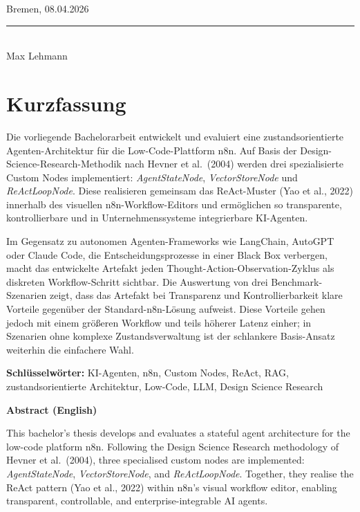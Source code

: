 \documentclass[12pt,a4paper,oneside]{report}
\begin{document}
\vspace{2cm}
\noindent
Bremen, 08.04.2026

\vspace{1.5cm}
\noindent\rule{7cm}{0.4pt}\\
Max Lehmann

\newpage

\thispagestyle{empty}
\chapter*{Kurzfassung}

Die vorliegende Bachelorarbeit entwickelt und evaluiert eine zustandsorientierte
Agenten-Architektur für die Low-Code-Plattform n8n. Auf Basis der Design-Science-Research-Methodik
nach Hevner et al.\ (2004) werden drei spezialisierte Custom Nodes implementiert:
\textit{AgentStateNode}, \textit{VectorStoreNode} und \textit{ReActLoopNode}. Diese
realisieren gemeinsam das ReAct-Muster (Yao et al., 2022) innerhalb des visuellen
n8n-Workflow-Editors und ermöglichen so transparente, kontrollierbare und in
Unternehmenssysteme integrierbare KI-Agenten.

Im Gegensatz zu autonomen Agenten-Frameworks wie LangChain, AutoGPT oder Claude Code,
die Entscheidungsprozesse in einer Black Box verbergen, macht das entwickelte Artefakt
jeden Thought-Action-Observation-Zyklus als diskreten Workflow-Schritt sichtbar.
Die Auswertung von drei Benchmark-Szenarien zeigt, dass das Artefakt bei Transparenz
und Kontrollierbarkeit klare Vorteile gegenüber der Standard-n8n-Lösung aufweist. Diese
Vorteile gehen jedoch mit einem größeren Workflow und teils höherer Latenz einher; in
Szenarien ohne komplexe Zustandsverwaltung ist der schlankere Basis-Ansatz weiterhin
die einfachere Wahl.

\vspace{1cm}
\noindent\textbf{Schlüsselwörter:} KI-Agenten, n8n, Custom Nodes, ReAct, RAG,
zustandsorientierte Architektur, Low-Code, LLM, Design Science Research

\vspace{1.5cm}
\noindent\textbf{Abstract (English)}

This bachelor's thesis develops and evaluates a stateful agent architecture for the
low-code platform n8n. Following the Design Science Research methodology of Hevner et al.\
(2004), three specialised custom nodes are implemented: \textit{AgentStateNode},
\textit{VectorStoreNode}, and \textit{ReActLoopNode}. Together, they realise the
ReAct pattern (Yao et al., 2022) within n8n's visual workflow editor, enabling
transparent, controllable, and enterprise-integrable AI agents.
\end{document}
